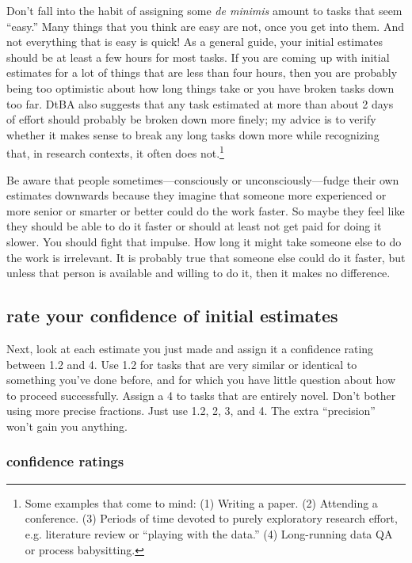 \documentclass[12pt,oneside]{book}
\begin{document}
Don't fall into the habit of assigning some \emph{de minimis} amount to tasks that seem ``easy.'' Many things that you think are easy are not, once you get into them. And not everything that is easy is quick! As a general guide, your initial estimates should be at least a few hours for most tasks. If you are coming up with initial estimates for a lot of things that are less than four hours, then you are probably being too optimistic about how long things take or you have broken tasks down too far. DtBA also suggests that any task estimated at more than about 2 days of effort should probably be broken down more finely; my advice is to verify whether it makes sense to break any long tasks down more while recognizing that, in research contexts, it often does not.\footnote{Some examples that come to mind: (1) Writing a paper. (2) Attending a conference. (3) Periods of time devoted to purely exploratory research effort, e.g. literature review or ``playing with the data.'' (4) Long-running data QA or process babysitting.}

Be aware that people sometimes---consciously or unconsciously---fudge their own estimates downwards because they imagine that someone more experienced or more senior or smarter or better could do the work faster. So maybe they feel like they should be able to do it faster or should at least not get paid for doing it slower. You should fight that impulse. How long it might take someone else to do the work is irrelevant. It is probably true that someone else could do it faster, but unless that person is available and willing to do it, then it makes no difference.


\subsection*{rate your confidence of initial estimates}

Next, look at each estimate you just made and assign it a confidence rating between 1.2 and 4. Use 1.2 for tasks that are very similar or identical to something you've done before, and for which you have little question about how to proceed successfully. Assign a 4 to tasks that are entirely novel. Don't bother using more precise fractions. Just use 1.2, 2, 3, and 4. The extra ``precision'' won't gain you anything.

\subsubsection*{confidence ratings}
\end{document}
